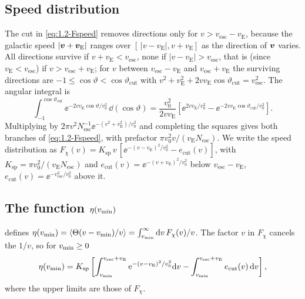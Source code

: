 \subsection*{Speed distribution}

The cut in \cref{eq:1.2-Fspeed} removes directions only for $v > v_{\mathrm{esc}} - v_{\mathrm{E}}$, because the galactic speed $|\bm{v} + \bm{v}_{\mathrm{E}}|$ ranges over $[\,|v - v_{\mathrm{E}}|, v + v_{\mathrm{E}}]$ as the direction of $\bm{v}$ varies. All directions survive if $v + v_{\mathrm{E}} < v_{\mathrm{esc}}$, none if $|v - v_{\mathrm{E}}| > v_{\mathrm{esc}}$, that is (since $v_{\mathrm{E}} < v_{\mathrm{esc}}$) if $v > v_{\mathrm{esc}} + v_{\mathrm{E}}$; for $v$ between $v_{\mathrm{esc}} - v_{\mathrm{E}}$ and $v_{\mathrm{esc}} + v_{\mathrm{E}}$ the surviving directions are $-1 \le \cos\vartheta < \cos\vartheta_{\mathrm{cut}}$ with $v^2 + v_{\mathrm{E}}^2 + 2vv_{\mathrm{E}}\cos\vartheta_{\mathrm{cut}} = v_{\mathrm{esc}}^2$. The angular integral is
\begin{equation*}
  \int_{-1}^{\cos\vartheta_{\mathrm{cut}}}\ee^{-2vv_{\mathrm{E}}\cos\vartheta/v_0^2}\,\dd(\cos\vartheta) = \frac{v_0^2}{2vv_{\mathrm{E}}}\left[\ee^{2vv_{\mathrm{E}}/v_0^2} - \ee^{-2vv_{\mathrm{E}}\cos\vartheta_{\mathrm{cut}}/v_0^2}\right].
\end{equation*}
Multiplying by $2\pi v^2 N_{\mathrm{esc}}^{-1}\ee^{-(v^2 + v_{\mathrm{E}}^2)/v_0^2}$ and completing the squares gives both branches of \cref{eq:1.2-Fspeed}, with prefactor $\pi v_0^2 v/(v_{\mathrm{E}}N_{\mathrm{esc}})$. We write the speed distribution as $F_\chi(v) = K_{\mathrm{sp}}\,v\,[\ee^{-(v - v_{\mathrm{E}})^2/v_0^2} - e_{\mathrm{cut}}(v)]$, with $K_{\mathrm{sp}} = \pi v_0^2/(v_{\mathrm{E}}N_{\mathrm{esc}})$ and $e_{\mathrm{cut}}(v) = \ee^{-(v + v_{\mathrm{E}})^2/v_0^2}$ below $v_{\mathrm{esc}} - v_{\mathrm{E}}$, $e_{\mathrm{cut}}(v) = \ee^{-v_{\mathrm{esc}}^2/v_0^2}$ above it.

\subsection*{The function \texorpdfstring{$\eta(v_{\mathrm{min}})$}{eta(vmin)}}

 defines $\eta(v_{\mathrm{min}}) = \langle \Theta(v - v_{\mathrm{min}})/v\rangle = \int_{v_{\mathrm{min}}}^\infty \mathrm{d} v\,F_\chi(v)/v$. The factor $v$ in $F_\chi$ cancels the $1/v$, so for $v_{\mathrm{min}} \ge 0$
\begin{equation*}
  \eta(v_{\mathrm{min}}) = K_{\mathrm{sp}}\left[\int_{v_{\mathrm{min}}}^{v_{\mathrm{esc}} + v_{\mathrm{E}}}\mathrm{e}^{-(v - v_{\mathrm{E}})^2/v_0^2}\mathrm{d} v - \int_{v_{\mathrm{min}}}^{v_{\mathrm{esc}} + v_{\mathrm{E}}}e_{\mathrm{cut}}(v)\,\mathrm{d} v\right],
\end{equation*}
where the upper limits are those of $F_\chi$.

